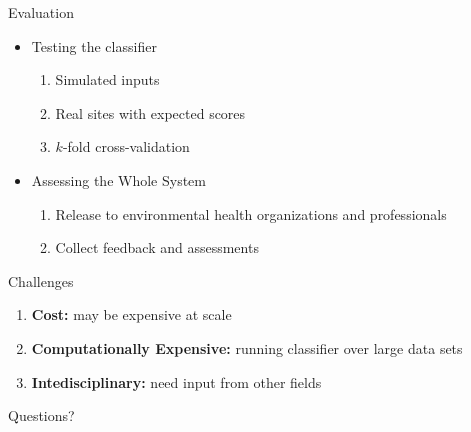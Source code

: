 \documentclass{beamer}
\begin{document}
\begin{frame}
    \huge{Evaluation}\normalsize
    \begin{itemize}
        \item<1->\large{\alert<2-5>{Testing the classifier}}\normalsize
        \begin{enumerate}
            \item<2-> Simulated inputs
            \item<3-> Real sites with expected scores
            \item<4-> $k$-fold cross-validation
        \end{enumerate}
        \item<5->\large{Assessing the Whole System}\normalsize
        \begin{enumerate}
            \item<6-> Release to environmental health organizations and professionals
            \item<7-> Collect feedback and assessments
        \end{enumerate}
    \end{itemize}
\end{frame}

\begin{frame}
    \huge{Challenges}\large
    \begin{enumerate}
        \item<2-> \textbf{Cost:} may be expensive at scale
        \item<3-> \textbf{Computationally Expensive:} running classifier over large data sets
        \item<4-> \textbf{Intedisciplinary:} need input from other fields
    \end{enumerate}
\end{frame}

\begin{frame}
    \huge{Questions?}
\end{frame}
\end{document}
